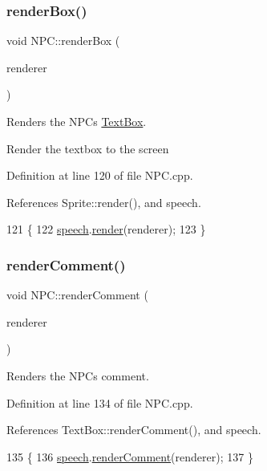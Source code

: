 \subsubsection{\texorpdfstring{render\+Box()}{renderBox()}}
{\footnotesize\ttfamily void N\+P\+C\+::render\+Box (\begin{DoxyParamCaption}\item[{S\+D\+L\+\_\+\+Renderer $\ast$}]{renderer }\end{DoxyParamCaption})}



Renders the N\+P\+Cs \hyperlink{class_text_box}{Text\+Box}. 

Render the textbox to the screen 

Definition at line 120 of file N\+P\+C.\+cpp.



References Sprite\+::render(), and speech.


\begin{DoxyCode}
121 \{
122     \hyperlink{class_n_p_c_a1a1be15df827227f45559388897a9cd5}{speech}.\hyperlink{class_sprite_a72231a3cc5414b94ab6bfcbddc3b327c}{render}(renderer);
123 \}
\end{DoxyCode}
\mbox{\label{class_n_p_c_abfad5a818584b5ee6fab0605873ae5c4}} 
\subsubsection{\texorpdfstring{render\+Comment()}{renderComment()}}
{\footnotesize\ttfamily void N\+P\+C\+::render\+Comment (\begin{DoxyParamCaption}\item[{S\+D\+L\+\_\+\+Renderer $\ast$}]{renderer }\end{DoxyParamCaption})}



Renders the N\+P\+Cs comment. 



Definition at line 134 of file N\+P\+C.\+cpp.



References Text\+Box\+::render\+Comment(), and speech.


\begin{DoxyCode}
135 \{
136     \hyperlink{class_n_p_c_a1a1be15df827227f45559388897a9cd5}{speech}.\hyperlink{class_text_box_a8746fe595a510ea6c3dc9908b448802c}{renderComment}(renderer);
137 \}
\end{DoxyCode}
\mbox{\label{class_n_p_c_a3e24b9fe9d34b635c2f57c48eab0b29d}} 
